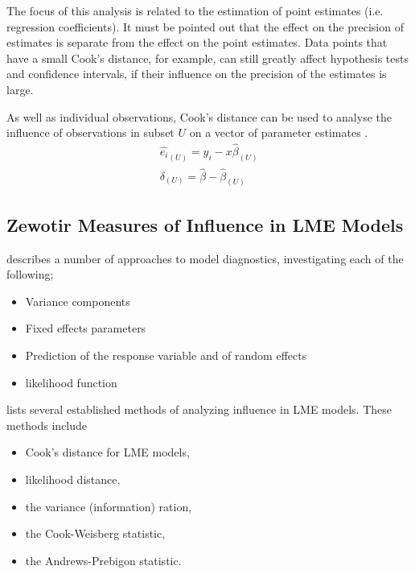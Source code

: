 \documentclass[12pt, a4paper]{report}
\theoremstyle{plain}
\theoremstyle{definition}
\theoremstyle{remark}
\begin{document}
The focus of this analysis is related to the estimation of point estimates (i.e. regression coefficients). It must be pointed out that the effect on the precision of estimates is separate from the effect on the point estimates. Data points that
have a small Cook's distance, for example, can still greatly affect hypothesis tests and confidence intervals, if their  influence on the precision of the estimates is large.

As well as individual observations, Cook's distance can be used to analyse the influence of observations in subset $U$ on a vector of parameter estimates \citep{cook77}.
\begin{eqnarray}
\hat{e_{i}}_{(U)} = y_{i} - x\hat{\beta}_{(U)}\\
\delta_{(U)} = \hat{\beta} - \hat{\beta}_{(U)}
\end{eqnarray}







\subsection{Zewotir Measures of Influence in LME Models}%
\citet{Zewotir} describes a number of approaches to model diagnostics, investigating each of the following;
\begin{itemize}
	\item Variance components
	\item Fixed effects parameters
	\item Prediction of the response variable and of random effects
	\item likelihood function
\end{itemize}



\citet{Zewotir} lists several established methods of analyzing influence in LME models. These methods include \begin{itemize}
	\item Cook's distance for LME models,
	\item {} likelihood distance,
	\item the variance (information) ration,
	\item the  Cook-Weisberg statistic,
	\item the  Andrews-Prebigon statistic.
\end{itemize}
\end{document}
